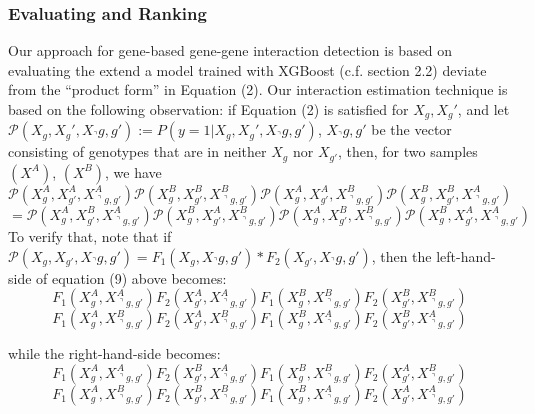 \documentclass[11pt]{article}
\theoremstyle{plain}
\theoremstyle{definition}
\theoremstyle{remark}
\begin{document}
\subsubsection{Evaluating and Ranking}

Our approach for gene-based gene-gene interaction detection is based on evaluating the extend a model trained with XGBoost (c.f. section 2.2) deviate from the ``product form'' in Equation (2). Our interaction estimation
technique is based on the following observation: if Equation (2) is satisfied for $X_g, X_g'$, and let $\mathcal{P}(X_g,X_g',X_\urcorner g,g'):=P(y=1|X_g,X_g',X_\urcorner g,g')$, $X_\urcorner g,g'$ be the vector consisting of genotypes that are in neither $X_g$ nor $X_{g'}$, then, for two samples $(X^A)$, $(X^B)$, we have
\begin{equation*}
\mathcal{P}(X^A_g,X^A_{g'},X^A_{\urcorner g,g'})\mathcal{P}(X^B_g,X^B_{g'},X^B_{\urcorner g,g'})\mathcal{P}(X^A_g,X^A_{g'},X^B_{\urcorner g,g'})\mathcal{P}(X^B_g,X^B_{g'},X^A_{\urcorner g,g'})
\end{equation*}
\begin{equation}=\mathcal{P}(X^A_g,X^B_{g'},X^A_{\urcorner g,g'})\mathcal{P}(X^B_g,X^A_{g'},X^B_{\urcorner g,g'})\mathcal{P}(X^A_g,X^B_{g'},X^B_{\urcorner g,g'})\mathcal{P}(X^B_g,X^A_{g'},X^A_{\urcorner g,g'})
\end{equation}
To verify that, note that if $\mathcal{P}(X_g,X_{g'},X_\urcorner g,g')=F_1(X_g, X_\urcorner g,g')*F_2(X_{g'},X_\urcorner g,g')$, then the left-hand-side of equation (9) above becomes:
\begin{equation*}
F_1(X^A_g,X^A_{\urcorner g,g'})F_2(X^A_{g'},X^A_{\urcorner g,g'})F_1(X^B_g,X^B_{\urcorner g,g'})F_2(X^B_{g'},X^B_{\urcorner g,g'})
\end{equation*}
\begin{equation*}
F_1(X^A_g,X^B_{\urcorner g,g'})F_2(X^A_{g'},X^B_{\urcorner g,g'})F_1(X^B_g,X^A_{\urcorner g,g'})F_2(X^B_{g'},X^A_{\urcorner g,g'})
\end{equation*}

\noindent while the right-hand-side becomes:
\begin{equation*}
F_1(X^A_g,X^A_{\urcorner g,g'})F_2(X^B_{g'},X^A_{\urcorner g,g'})F_1(X^B_g,X^B_{\urcorner g,g'})F_2(X^A_{g'},X^B_{\urcorner g,g'})
\end{equation*}
\begin{equation*}
F_1(X^A_g,X^B_{\urcorner g,g'})F_2(X^B_{g'},X^B_{\urcorner g,g'})F_1(X^B_g,X^A_{\urcorner g,g'})F_2(X^A_{g'},X^A_{\urcorner g,g'})
\end{equation*}
\end{document}
